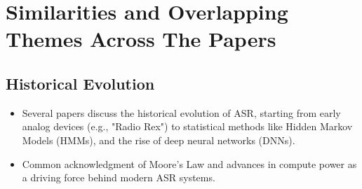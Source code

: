 \section{Similarities and Overlapping Themes Across The Papers}
\subsection{Historical Evolution}
\begin{itemize}
    \item Several papers discuss the historical evolution of ASR, starting from early analog devices (e.g., "Radio Rex") to statistical methods like Hidden Markov Models (HMMs), and the rise of deep neural networks (DNNs).
    \item Common acknowledgment of Moore’s Law and advances in compute power as a driving force behind modern ASR systems.
\end{itemize}
